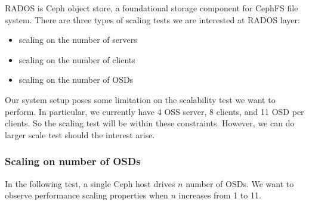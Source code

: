 \documentclass{article}
\begin{document}
RADOS is Ceph object store, a foundational storage component for CephFS file
system. There are three types of scaling tests we are interested at RADOS layer:

\begin{itemize}
  \item scaling on the number of servers
  \item scaling on the number of clients
  \item scaling on the number of OSDs
\end{itemize}

Our system setup poses some limitation on the scalability test we want to
perform. In particular, we currently have 4 OSS server, 8 clients, and 11 OSD
per clients. So the scaling test will be within these constraints. However, we
can do larger scale test should the interest arise. 

\subsubsection{Scaling on number of OSDs}

In the following test, a single Ceph host drives $n$ number of OSDs. We
want to observe performance scaling properties when $n$ increases from 1 to
11. 
\end{document}

